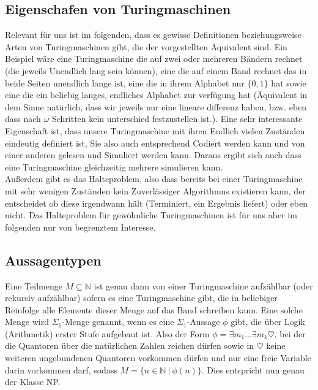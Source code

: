 \documentclass{scrartcl}
\begin{document}
\subsection{Eigenschafen von Turingmaschinen}
Relevant für uns ist im folgenden, dass es gewisse Definitionen beziehungsweise
Arten von Turingmaschinen gibt, die der vorgestellten Äquivalent sind. Ein
Beispiel wäre eine Turingmaschine die auf zwei oder mehreren Bändern rechnet
(die jeweils Unendlich lang sein können), eine die auf einem Band rechnet das
in beide Seiten unendlich lange ist, eine die in ihrem Alphabet nur $\{0, 1\}$
hat sowie eine die ein beliebig langes, endliches Alphabet zur verfügung hat
(Äquivalent in dem Sinne natürlich, dass wir jeweils nur eine lineare differenz
haben, bzw. eben dass nach $\omega$ Schritten kein unterschied festzustellen
ist.). Eine sehr interessante Eigenschaft ist, dass unsere Turingmaschine mit
ihren Endlich vielen Zuständen eindeutig definiert ist, Sie also auch
entsprechend Codiert werden kann und von einer anderen gelesen und Simuliert
werden kann. Daraus ergibt sich auch dass eine Turingmaschine gleichzeitig
mehrere simulieren kann. \\ Außerdem gibt es das Halteproblem, also dass
bereits bei einer Turingmaschine mit sehr wenigen Zuständen kein Zuverlässiger
Algorithmus existieren kann, der entscheidet ob diese irgendwann hält
(Terminiert, ein Ergebnis liefert) oder eben nicht. Das Halteproblem für
gewöhnliche Turingmaschinen ist für uns aber im folgenden nur von begrenztem
Interesse.


\subsection{Aussagentypen}
Eine Teilmenge $M \subseteq \mathbb{N}$ ist genau dann von einer Turingmaschine
aufzählbar (oder rekursiv aufzählbar) sofern es eine Turingmaschine gibt, die
in beliebiger Reinfolge alle Elemente dieser Menge auf das Band schreiben
kann. Eine solche Menge wird $\Sigma_1$-Menge genannt, wenn es eine
$\Sigma_1$-Aussage $\phi$ gibt, die über Logik (Arithmetik) erster Stufe
aufgebaut ist. Also der Form $\phi = \exists m_1...\exists m_k \heartsuit$,
bei der die Quantoren über die natürlichen Zahlen reichen dürfen sowie in
$\heartsuit$ keine weiteren ungebundenen Quantoren vorkommen dürfen und nur
eine freie Variable darin vorkommen darf, sodass $M = \{n \in \mathbb{N}\ |\
\phi(n)\}$. Dies entspricht nun genau der Klasse NP.

\end{document}
